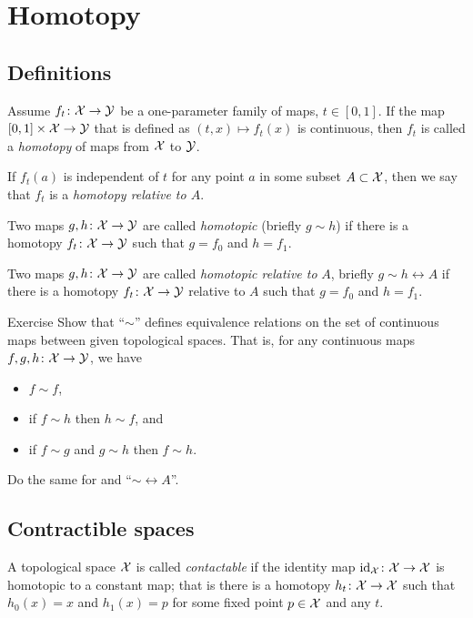 \chapter{Homotopy}


\section{Definitions}

Assume $f_t\colon\mathcal{X}\to \mathcal{Y}$ be a one-parameter family of maps, $t\in [0,1]$.
If the map $[0,1]\times \mathcal{X}\to \mathcal{Y}$ that is defined as $(t,x)\mapsto f_t(x)$ is continuous, then $f_t$ is called a \emph{homotopy} of maps from $\mathcal{X}$ to $\mathcal{Y}$.

If $f_t(a)$ is independent of $t$ for any point $a$ in some subset $A\subset \mathcal{X}$, then we say that  $f_t$ is a \emph{homotopy relative to $A$}. 

Two maps $g,h\colon\mathcal{X}\to \mathcal{Y}$ are called \emph{homotopic} (briefly $g\sim h$)
if there is a homotopy $f_t\colon\mathcal{X}\to \mathcal{Y}$ such that $g=f_0$ and $h=f_1$.

Two maps $g,h\colon\mathcal{X}\to \mathcal{Y}$ are called \emph{homotopic relative to} $A$, briefly $g\sim h\rel A$
if there is a homotopy $f_t\colon\mathcal{X}\to \mathcal{Y}$ relative to $A$ such that $g=f_0$ and $h=f_1$.

\begin{thm}{Exercise}\label{ex:hom-eq}
Show that ``$\sim$''  defines equivalence relations on the set of continuous maps between given topological spaces.
That is, for any continuous maps $f,g,h\colon\mathcal{X}\to \mathcal{Y}$, we have 
\begin{itemize}
\item $f\sim f$, 
\item if $f\sim h$ then $h\sim f$, and
\item if $f\sim g$ and $g\sim h$ then $f\sim h$.
\end{itemize}
Do the same for and ``$\sim\rel A$''.
\end{thm}



\section{Contractible spaces}

A topological space $\mathcal{X}$ is called \emph{contactable} if the identity map $\id_\c{X}\:\c{X}\z\to \c{X}$ is homotopic to a constant map;
that is there is a homotopy $h_t\colon\mathcal{X}\to\mathcal{X}$ such that $h_0(x)=x$ and $h_1(x)=p$ for some fixed point $p\in\mathcal{X}$ and any $t$.

